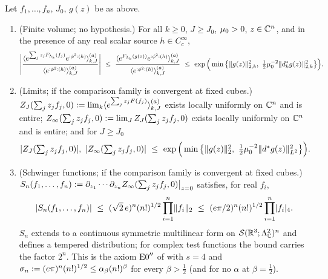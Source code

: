 \begin{theorem}\label{thm:s05:C}
Let $f_1,\dots,f_n$, $J_0$, $g(z)$ be as above.
\begin{enumerate}[label=\textup{(\alph*)},leftmargin=*]
\item \textup{(Finite volume; no hypothesis.)} For all $k\ge0$, $J\ge J_0$, $\mu_0>0$, $z\in\mathbb C^n$, and in the presence of any real scalar source $h\in C^\infty_c$,
\[
\Bigg|\frac{\ava{e^{\sum_jz_jF_{\Lk}(f_j)}e^{\Wick h}}}{\ava{e^{\Wick h}}}\Bigg|
\ \le\ \frac{\ava{e^{F_{\Lk}(g(z))}e^{\Wick h}}}{\ava{e^{\Wick h}}}
\ \le\ \exp\Big(\min\big\{\norm{g(z)}^2_{2,k},\ \tfrac12\lmu^{-2}\norm{\dstar_kg(z)}^2_{2,k}\big\}\Big).
\]
\item \textup{(Limits; if the comparison family is convergent at fixed cubes.)} $Z_J(\sum_jz_jf_j,0):=\lim_k\langle e^{\sum_jz_jF(f_j)}\rangle^{(a)}_{k,J}$ exists locally uniformly on $\mathbb C^n$ and is entire; $Z_\infty(\sum_jz_jf_j,0):=\lim_JZ_J(\sum_jz_jf_j,0)$ exists locally uniformly on $\mathbb C^n$ and is entire; and for $J\ge J_0$
\[
|Z_J(\textstyle\sum_jz_jf_j,0)|,\ |Z_\infty(\textstyle\sum_jz_jf_j,0)|\ \le\ \exp\Big(\min\big\{\norm{g(z)}_2^2,\ \tfrac12\lmu^{-2}\norm{\dstar g(z)}^2_{L^2}\big\}\Big).
\]
\item \textup{(Schwinger functions; if the comparison family is convergent at fixed cubes.)} $S_n(f_1,\dots,f_n):=\partial_{z_1}\cdots\partial_{z_n}Z_\infty(\sum_jz_jf_j,0)\big|_{z=0}$ satisfies, for real $f_i$,
\[
|S_n(f_1,\dots,f_n)|\ \le\ (\sqrt2\,e)^n(n!)^{1/2}\prod_{i=1}^n\norm{f_i}_2\ \le\ (e\pi/2)^n(n!)^{1/2}\prod_{i=1}^n\fournorm{f_i}.
\]
$S_n$ extends to a continuous symmetric multilinear form on $\mathcal S(\mathbb R^3;\Lambda^2_{\mathbb C})^n$ and defines a tempered distribution; for complex test functions the bound carries the factor $2^n$. This is the axiom $\mathrm{E0}''$ of \cite{OS75} with $s=4$ and $\sigma_n:=(e\pi)^n(n!)^{1/2}\le\alpha_\beta(n!)^\beta$ for every $\beta>\frac12$ (and for no $\alpha$ at $\beta=\frac12$).
\end{enumerate}
\end{theorem}

